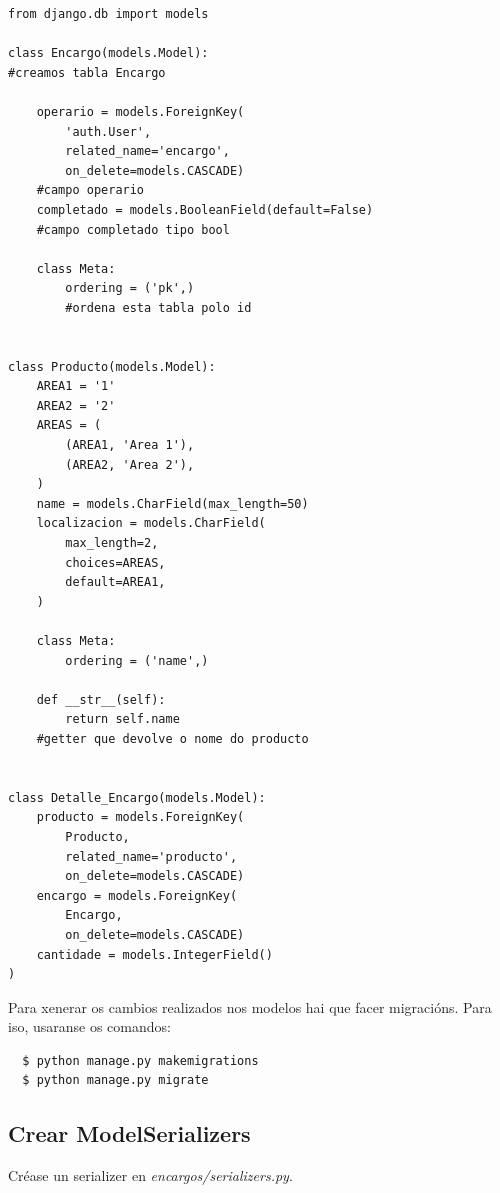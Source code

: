 \documentclass[11pt,twoside]{book}
\begin{document}
\begin{verbatim}
from django.db import models

class Encargo(models.Model):                          
#creamos tabla Encargo                     

    operario = models.ForeignKey(                      
        'auth.User',
        related_name='encargo',
        on_delete=models.CASCADE)
    #campo operario
    completado = models.BooleanField(default=False)  
    #campo completado tipo bool

    class Meta:                                      
        ordering = ('pk',)
        #ordena esta tabla polo id


class Producto(models.Model):
    AREA1 = '1'
    AREA2 = '2'
    AREAS = (
        (AREA1, 'Area 1'),
        (AREA2, 'Area 2'),
    )
    name = models.CharField(max_length=50)
    localizacion = models.CharField(
        max_length=2,
        choices=AREAS,
        default=AREA1, 
    )

    class Meta: 
        ordering = ('name',)

    def __str__(self):
        return self.name                      
    #getter que devolve o nome do producto


class Detalle_Encargo(models.Model):
    producto = models.ForeignKey(
        Producto, 
        related_name='producto', 
        on_delete=models.CASCADE)
    encargo = models.ForeignKey(
        Encargo, 
        on_delete=models.CASCADE)
    cantidade = models.IntegerField()
)
\end{verbatim}

Para xenerar os cambios realizados nos modelos hai que facer migracións. Para iso, usaranse os comandos:

\begin{verbatim}
  $ python manage.py makemigrations 
  $ python manage.py migrate
\end{verbatim}

\subsection{Crear ModelSerializers}

Créase un serializer en \textit{encargos/serializers.py}. 
\end{document}
